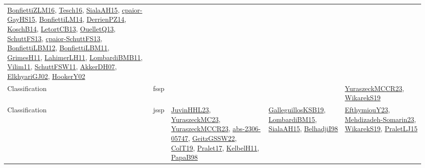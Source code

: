 {\begin{longtable}{llp{6cm}p{6cm}p{6cm}}
\href{papers/BonfiettiZLM16.pdf}{BonfiettiZLM16}\cite{BonfiettiZLM16}, \href{papers/Tesch16.pdf}{Tesch16}\cite{Tesch16}, \href{papers/SialaAH15.pdf}{SialaAH15}\cite{SialaAH15}, \href{papers/cpaior-GayHS15.pdf}{cpaior-GayHS15}\cite{cpaior-GayHS15}, \href{papers/BonfiettiLM14.pdf}{BonfiettiLM14}\cite{BonfiettiLM14}, \href{papers/DerrienPZ14.pdf}{DerrienPZ14}\cite{DerrienPZ14}, \href{papers/KoschB14.pdf}{KoschB14}\cite{KoschB14}, \href{papers/LetortCB13.pdf}{LetortCB13}\cite{LetortCB13}, \href{papers/OuelletQ13.pdf}{OuelletQ13}\cite{OuelletQ13}, \href{papers/SchuttFS13.pdf}{SchuttFS13}\cite{SchuttFS13}, \href{papers/cpaior-SchuttFS13.pdf}{cpaior-SchuttFS13}\cite{cpaior-SchuttFS13}, \href{papers/BonfiettiLBM12.pdf}{BonfiettiLBM12}\cite{BonfiettiLBM12}, \href{papers/BonfiettiLBM11.pdf}{BonfiettiLBM11}\cite{BonfiettiLBM11}, \href{papers/GrimesH11.pdf}{GrimesH11}\cite{GrimesH11}, \href{papers/LahimerLH11.pdf}{LahimerLH11}\cite{LahimerLH11}, \href{papers/LombardiBMB11.pdf}{LombardiBMB11}\cite{LombardiBMB11}, \href{papers/Vilim11.pdf}{Vilim11}\cite{Vilim11}, \href{articles/SchuttFSW11.pdf}{SchuttFSW11}\cite{SchuttFSW11}, \href{papers/AkkerDH07.pdf}{AkkerDH07}\cite{AkkerDH07}, \href{papers/ElkhyariGJ02.pdf}{ElkhyariGJ02}\cite{ElkhyariGJ02}, \href{papers/HookerY02.pdf}{HookerY02}\cite{HookerY02}\\
Classification & fssp &  &  & \href{articles/YuraszeckMCCR23.pdf}{YuraszeckMCCR23}\cite{YuraszeckMCCR23}, \href{articles/WikarekS19.pdf}{WikarekS19}\cite{WikarekS19}\\
Classification & jssp & \href{papers/JuvinHHL23.pdf}{JuvinHHL23}\cite{JuvinHHL23}, \href{papers/YuraszeckMC23.pdf}{YuraszeckMC23}\cite{YuraszeckMC23}, \href{articles/YuraszeckMCCR23.pdf}{YuraszeckMCCR23}\cite{YuraszeckMCCR23}, \href{articles/abs-2306-05747.pdf}{abs-2306-05747}\cite{abs-2306-05747}, \href{papers/GeitzGSSW22.pdf}{GeitzGSSW22}\cite{GeitzGSSW22}, \href{papers/ColT19.pdf}{ColT19}\cite{ColT19}, \href{papers/Pralet17.pdf}{Pralet17}\cite{Pralet17}, \href{articles/KelbelH11.pdf}{KelbelH11}\cite{KelbelH11}, \href{articles/PapaB98.pdf}{PapaB98}\cite{PapaB98} & \href{papers/GalleguillosKSB19.pdf}{GalleguillosKSB19}\cite{GalleguillosKSB19}, \href{papers/LombardiBM15.pdf}{LombardiBM15}\cite{LombardiBM15}, \href{papers/SialaAH15.pdf}{SialaAH15}\cite{SialaAH15}, \href{articles/BelhadjiI98.pdf}{BelhadjiI98}\cite{BelhadjiI98} & \href{papers/EfthymiouY23.pdf}{EfthymiouY23}\cite{EfthymiouY23}, \href{papers/Mehdizadeh-Somarin23.pdf}{Mehdizadeh-Somarin23}\cite{Mehdizadeh-Somarin23}, \href{articles/WikarekS19.pdf}{WikarekS19}\cite{WikarekS19}, \href{papers/PraletLJ15.pdf}{PraletLJ15}\cite{PraletLJ15}\\

\end{longtable}}
